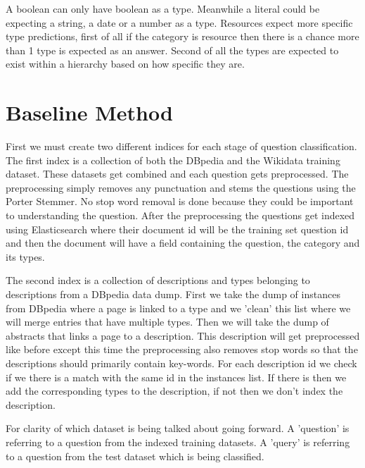 \documentclass[sigconf]{acmart}
\begin{document}
A boolean can only have boolean as a type. Meanwhile a literal could be expecting a string, a date or a number as a type. Resources expect more specific type predictions, first of all if the category is resource then there is a chance more than 1 type is expected as an answer. Second of all the types are expected to exist within a hierarchy based on how specific they are.



\section{Baseline Method}
First we must create two different indices for each stage of question classification. The first index is a collection of both the DBpedia and the Wikidata training dataset. These datasets get combined and each question gets preprocessed. The preprocessing simply removes any punctuation and stems the questions using the Porter Stemmer. No stop word removal is done because they could be important to understanding the question. After the preprocessing the questions get indexed using Elasticsearch where their document id will be the training set question id and then the document will have a field containing the question, the category and its types. 

The second index is a collection of descriptions and types belonging to descriptions from a DBpedia data dump. First we take the dump of instances from DBpedia where a page is linked to a type and we 'clean' this list where we will merge entries that have multiple types. Then we will take the dump of abstracts that links a page to a description. This description will get preprocessed like before except this time the preprocessing also removes stop words so that the descriptions should primarily contain key-words. For each description id we check if we there is a match with the same id in the instances list. If there is then we add the corresponding types to the description, if not then we don't index the description. 

\hfill \break
For clarity of which dataset is being talked about going forward. A 'question' is referring to a question from the indexed training datasets. A 'query' is referring to a question from the test dataset which is being classified. 
\hfill \break
\end{document}

